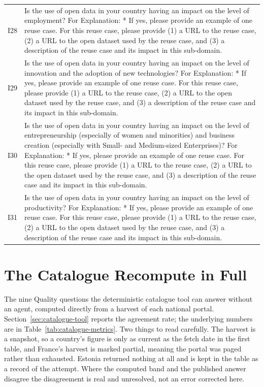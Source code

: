 {\begin{longtable}[]{@{}
  L{0.1386}
  L{0.8614}@{}}
I28 & Is the use of open data in your country having an impact on the level of employment? For Explanation: * If yes, please provide an example of one reuse case. For this reuse case, please provide (1) a URL to the reuse case, (2) a URL to the open dataset used by the reuse case, and (3) a description of the reuse case and its impact in this sub-domain. \\
I29 & Is the use of open data in your country having an impact on the level of innovation and the adoption of new technologies? For Explanation: * If yes, please provide an example of one reuse case. For this reuse case, please provide (1) a URL to the reuse case, (2) a URL to the open dataset used by the reuse case, and (3) a description of the reuse case and its impact in this sub-domain. \\
I30 & Is the use of open data in your country having an impact on the level of entrepreneurship (especially of women and minorities) and business creation (especially with Small- and Medium-sized Enterprises)? For Explanation: * If yes, please provide an example of one reuse case. For this reuse case, please provide (1) a URL to the reuse case, (2) a URL to the open dataset used by the reuse case, and (3) a description of the reuse case and its impact in this sub-domain. \\
I31 & Is the use of open data in your country having an impact on the level of productivity? For Explanation: * If yes, please provide an example of one reuse case. For this reuse case, please provide (1) a URL to the reuse case, (2) a URL to the open dataset used by the reuse case, and (3) a description of the reuse case and its impact in this sub-domain. \\
\end{longtable}
}


\chapter{The Catalogue Recompute in Full}\label{app:catalogue-recompute}

The nine Quality questions the deterministic catalogue tool can answer without an agent, computed directly from a harvest of each national portal. Section~\ref{sec:catalogue-tool} reports the agreement rate; the underlying numbers are in Table~\ref{tab:catalogue-metrics}. Two things to read carefully. The harvest is a snapshot, so a country's figure is only as current as the fetch date in the first table, and France's harvest is marked partial, meaning the portal was paged rather than exhausted. Estonia returned nothing at all and is kept in the table as a record of the attempt. Where the computed band and the published answer disagree the disagreement is real and unresolved, not an error corrected here.

